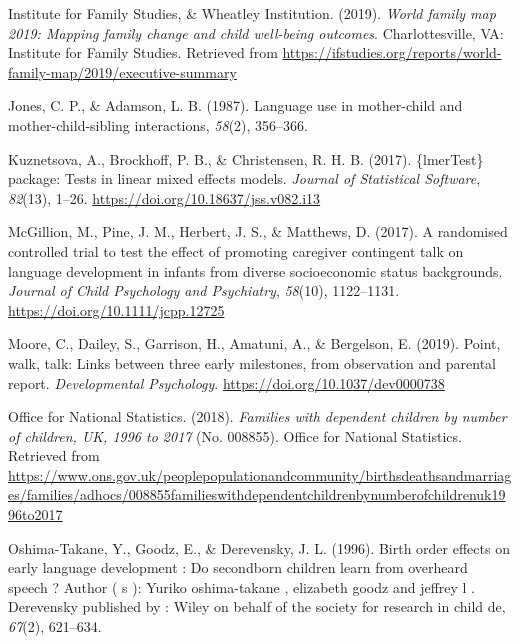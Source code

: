 \documentclass[
  english,
  man,floatsintext]{apa6}
\begin{document}
\leavevmode\hypertarget{ref-institute_for_family_studies_world_2019}{}%
Institute for Family Studies, \& Wheatley Institution. (2019). \emph{World family map 2019: Mapping family change and child well-being outcomes}. Charlottesville, VA: Institute for Family Studies. Retrieved from \url{https://ifstudies.org/reports/world-family-map/2019/executive-summary}

\leavevmode\hypertarget{ref-jones_language_1987}{}%
Jones, C. P., \& Adamson, L. B. (1987). Language use in mother-child and mother-child-sibling interactions, \emph{58}(2), 356--366.

\leavevmode\hypertarget{ref-kuznetsova_lmertest_2017}{}%
Kuznetsova, A., Brockhoff, P. B., \& Christensen, R. H. B. (2017). \{lmerTest\} package: Tests in linear mixed effects models. \emph{Journal of Statistical Software}, \emph{82}(13), 1--26. \url{https://doi.org/10.18637/jss.v082.i13}

\leavevmode\hypertarget{ref-mcgillion_randomised_2017}{}%
McGillion, M., Pine, J. M., Herbert, J. S., \& Matthews, D. (2017). A randomised controlled trial to test the effect of promoting caregiver contingent talk on language development in infants from diverse socioeconomic status backgrounds. \emph{Journal of Child Psychology and Psychiatry}, \emph{58}(10), 1122--1131. \url{https://doi.org/10.1111/jcpp.12725}

\leavevmode\hypertarget{ref-moore_point_2019}{}%
Moore, C., Dailey, S., Garrison, H., Amatuni, A., \& Bergelson, E. (2019). Point, walk, talk: Links between three early milestones, from observation and parental report. \emph{Developmental Psychology}. \url{https://doi.org/10.1037/dev0000738}

\leavevmode\hypertarget{ref-office_for_national_statistics_families_2018}{}%
Office for National Statistics. (2018). \emph{Families with dependent children by number of children, UK, 1996 to 2017} (No. 008855). Office for National Statistics. Retrieved from \url{https://www.ons.gov.uk/peoplepopulationandcommunity/birthsdeathsandmarriages/families/adhocs/008855familieswithdependentchildrenbynumberofchildrenuk1996to2017}

\leavevmode\hypertarget{ref-oshima-takane_birth_1996}{}%
Oshima-Takane, Y., Goodz, E., \& Derevensky, J. L. (1996). Birth order effects on early language development : Do secondborn children learn from overheard speech ? Author ( s ): Yuriko oshima-takane , elizabeth goodz and jeffrey l . Derevensky published by : Wiley on behalf of the society for research in child de, \emph{67}(2), 621--634.
\end{document}
